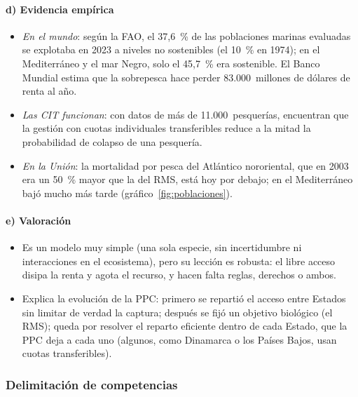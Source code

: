 \documentclass[11pt]{article}
\begin{document}
\paragraph{d) Evidencia empírica}

\begin{itemize}
\item \emph{En el mundo}: según la FAO, el 37,6~\% de las poblaciones marinas evaluadas se explotaba en 2023 a niveles no sostenibles (el 10~\% en 1974); en el Mediterráneo y el mar Negro, solo el 45,7~\% era sostenible\nocite{FAO2026SOFIA}. El Banco Mundial estima que la sobrepesca hace perder 83.000~millones de dólares de renta al año\nocite{BancoMundial2017Sunken}.
\item \emph{Las CIT funcionan}: con datos de más de 11.000~pesquerías, \textcite{CostelloGainesLynham2008} encuentran que la gestión con cuotas individuales transferibles reduce a la mitad la probabilidad de colapso de una pesquería.
\item \emph{En la Unión}: la mortalidad por pesca del Atlántico nororiental, que en 2003 era un 50~\% mayor que la del RMS, está hoy por debajo; en el Mediterráneo bajó mucho más tarde (gráfico~\ref{fig:poblaciones}).
\end{itemize}

\paragraph{e) Valoración}

\begin{itemize}
\item Es un modelo muy simple (una sola especie, sin incertidumbre ni interacciones en el ecosistema), pero su lección es robusta: el libre acceso disipa la renta y agota el recurso, y hacen falta reglas, derechos o ambos.
\item Explica la evolución de la PPC: primero se repartió el acceso entre Estados sin limitar de verdad la captura; después se fijó un objetivo biológico (el RMS); queda por resolver el reparto eficiente dentro de cada Estado, que la PPC deja a cada uno (algunos, como Dinamarca o los Países Bajos, usan cuotas transferibles).
\end{itemize}

\subsubsection{Delimitación de competencias}\label{sec:competencias-ppc}
\end{document}
